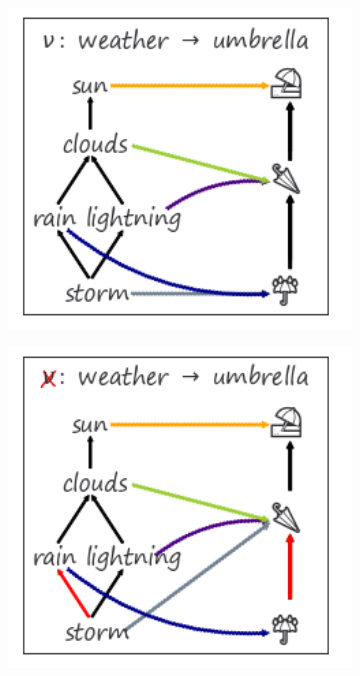 \documentclass[../main.tex]{subfiles}
\begin{document}
\begin{figure}[htb]
  \centering
  \begin{subfigure}{.49\textwidth}
    \includegraphics[width=1\textwidth]{figures/math/partial_fixed.png}
    \caption{}
    \label{fig:math:artist:nu:valid}
  \end{subfigure}
  \begin{subfigure}{.49\textwidth}
    \includegraphics[width=1\textwidth]{figures/math/partial_invalid.png}

\end{subfigure}
\end{figure}
\end{document}
